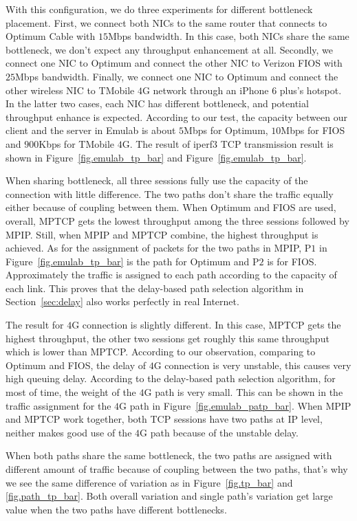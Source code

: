 With this configuration, we do three experiments for different bottleneck placement. First, we connect both NICs to the same router that connects to Optimum Cable with $15$Mbps bandwidth. In this case, both NICs share the same bottleneck, we don't expect any throughput enhancement at all. Secondly, we connect one NIC to Optimum and connect the other NIC to Verizon FIOS with $25$Mbps bandwidth. Finally, we connect one NIC to Optimum and connect the other wireless NIC to TMobile $4$G network through an iPhone 6 plus's hotspot. In the latter two cases, each NIC has different bottleneck, and potential throughput enhance is expected. According to our test, the capacity between our client and the server in Emulab is about $5$Mbps for Optimum, $10$Mbps for FIOS and $900$Kbps for TMobile $4$G. The result of iperf3 TCP transmission result is shown in Figure~\ref{fig.emulab_tp_bar} and Figure~\ref{fig.emulab_tp_bar}.

When sharing bottleneck, all three sessions fully use the capacity of the connection with little difference. The two paths don't share the traffic equally either because of coupling between them. When Optimum and FIOS are used, overall, MPTCP gets the lowest throughput among the three sessions followed by MPIP. Still, when MPIP and MPTCP combine, the highest throughput is achieved. As for the assignment of packets for the two paths in MPIP, P$1$ in Figure~\ref{fig.emulab_tp_bar} is the path for Optimum and P$2$ is for FIOS. Approximately the traffic is assigned to each path according to the capacity of each link. This proves that the delay-based path selection algorithm in Section~\ref{sec:delay} also works perfectly in real Internet. 

The result for $4$G connection is slightly different. In this case, MPTCP gets the highest throughput, the other two sessions get roughly this same throughput which is lower than MPTCP. According to our observation, comparing to Optimum and FIOS, the delay of $4$G connection is very unstable, this causes very high queuing delay. According to the delay-based path selection algorithm, for most of time, the weight of the $4$G path is very small. This can be shown in the traffic assignment for the $4$G path in Figure~\ref{fig.emulab_patp_bar}. When MPIP and MPTCP work together, both TCP sessions have two paths at IP level, neither makes good use of the $4$G path because of the unstable delay.

When both paths share the same bottleneck, the two paths are assigned with different amount of traffic because of coupling between the two paths, that's why we see the same difference of variation as in Figure~\ref{fig.tp_bar} and \ref{fig.path_tp_bar}. Both overall variation and single path's variation get large value when the two paths have different bottlenecks.

